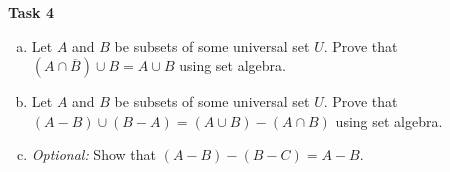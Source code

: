 \documentclass[12pt,letterpaper]{article}
\newif\ifsol
\newcommand{\solu}[2]{ \begin{mdframed} \ifsol #2 \else \vspace{#1} \fi \end{mdframed} }
\begin{document}
\textbf{Task 4}
\begin{enumerate}[a.]
    \item Let $A$ and $B$ be subsets of some universal set $U$. Prove that $(A \cap \overline{B}) \cup B = A \cup B$ using set algebra.
    \solu{4cm}{\begin{flalign*}
& (A \cap \overline{B}) \cup B \\
&= (A \cup B) \cap (\overline{B} \cup B) && \text{(Distributive Law)}\\
&= (A \cup B) \cap U && \text{(Complement Law)}\\
&= A \cup B && \text{(Identity Law)}
\end{flalign*}}

    \item Let $A$ and $B$ be subsets of some universal set $U$. Prove that $(A - B) \cup (B - A) = (A \cup B) - (A \cap B)$ using set algebra.
    
    \solu{4cm}{\begin{flalign*}
& (A - B) \cup (B - A) \\
&= (A \cap \overline{B}) \cup (B \cap \overline{A}) && \text{(Set Difference Law)}\\
&= (A \cap \overline{B} \cup B) \cap ((A \cap \overline{B} \cup \overline{A}) && \text{(Distributive Law)}\\
&= ((A \cup B) \cap (\overline{B} \cup B)) \cap ((A \cup \overline{A}) \cap (\overline{B} \cup \overline{A})) && \text{(Distributive Law)}\\
&= ((A \cup B) \cap U) \cap (U \cap \overline{B} \cup \overline{A}) && \text{(Complement Law)}\\
&= (A \cup B) \cap (\overline{B} \cup \overline{A}) && \text{(Identity Law)}\\
&= (A \cup B) \cap (\overline{A \cap B}) && \text{(DeMorgan's Law)}\\
&= (A \cup B) - (A \cap B) && \text{(Set Difference Law)}
\end{flalign*}}

    \item \textit{Optional: }Show that $(A - B) - (B - C) = A - B$.
    

\end{enumerate}
\end{document}
